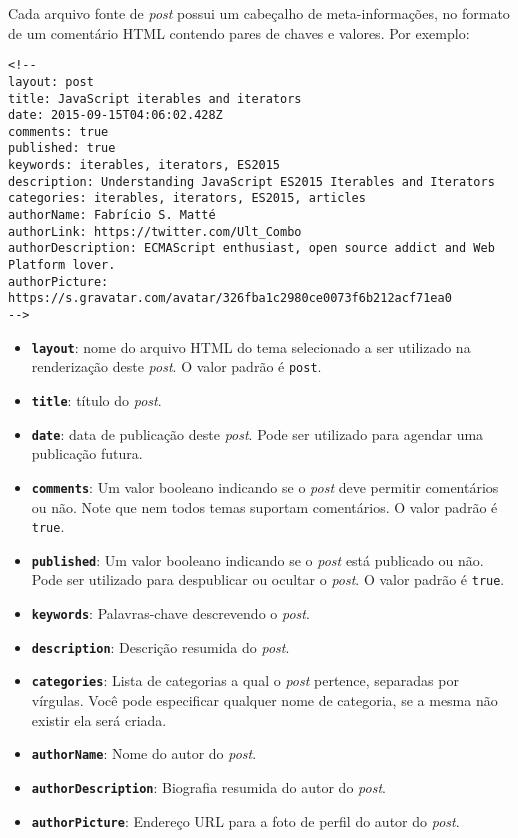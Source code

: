 \documentclass[ppginf, pep]{esinucpel}
\newcommand{\code}[1]{\texttt{#1}}
\begin{document}
Cada arquivo fonte de \textit{post} possui um cabeçalho de meta-informações, no formato de um comentário HTML contendo pares de chaves e valores. Por exemplo:

\lstset{language=HTML}
\begin{lstlisting}
<!--
layout: post
title: JavaScript iterables and iterators
date: 2015-09-15T04:06:02.428Z
comments: true
published: true
keywords: iterables, iterators, ES2015
description: Understanding JavaScript ES2015 Iterables and Iterators
categories: iterables, iterators, ES2015, articles
authorName: Fabrício S. Matté
authorLink: https://twitter.com/Ult_Combo
authorDescription: ECMAScript enthusiast, open source addict and Web Platform lover.
authorPicture: https://s.gravatar.com/avatar/326fba1c2980ce0073f6b212acf71ea0
-->
\end{lstlisting}

\begin{itemize}
	\item \textbf{\code{layout}}: nome do arquivo HTML do tema selecionado a ser utilizado na renderização deste \textit{post}. O valor padrão é \code{post}.
	\item \textbf{\code{title}}: título do \textit{post}.
	\item \textbf{\code{date}}: data de publicação deste \textit{post}. Pode ser utilizado para agendar uma publicação futura.
	\item \textbf{\code{comments}}: Um valor booleano indicando se o \textit{post} deve permitir comentários ou não. Note que nem todos temas suportam comentários. O valor padrão é \code{true}.
	\item \textbf{\code{published}}: Um valor booleano indicando se o \textit{post} está publicado ou não. Pode ser utilizado para despublicar ou ocultar o \textit{post}. O valor padrão é \code{true}.
	\item \textbf{\code{keywords}}: Palavras-chave descrevendo o \textit{post}.
	\item \textbf{\code{description}}: Descrição resumida do \textit{post}.
	\item \textbf{\code{categories}}: Lista de categorias a qual o \textit{post} pertence, separadas por vírgulas. Você pode especificar qualquer nome de categoria, se a mesma não existir ela será criada.
	\item \textbf{\code{authorName}}: Nome do autor do \textit{post}.
	\item \textbf{\code{authorDescription}}: Biografia resumida do autor do \textit{post}.
	\item \textbf{\code{authorPicture}}: Endereço URL para a foto de perfil do autor do \textit{post}.
\end{itemize}
\end{document}
